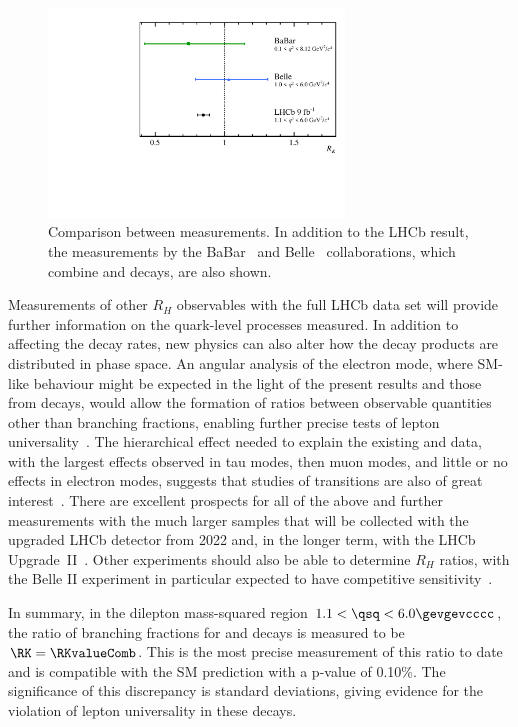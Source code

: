 \begin{figure}[!t]
    \centering
    \includegraphics[width=0.7\textwidth]{figures/Fig4.pdf} 
    \caption{Comparison between \RK measurements. 
    In addition to the LHCb result, the measurements by the BaBar~\cite{RKbabar} and Belle~\cite{RKbelle} collaborations, which combine \BuKll and \BdKSll decays, are also shown.
    }
    \label{fig:RKresult}
\end{figure}

Measurements of other $R_H$ observables with the full LHCb data set will provide further information on the quark-level processes measured. 
In addition to affecting the decay rates, new physics can also alter how the decay products are distributed in phase space. 
An angular analysis of the electron mode, where SM-like behaviour might be expected in the light of the present results and those from \btosmumubar decays, would allow the formation of ratios between observable quantities other than branching fractions, enabling further precise tests of lepton universality~\cite{Altmannshofer:2015mqa,Capdevila:2016ivx,Wehle:2016yoi,Geng:2017svp,Serra:2016ivr}. The hierarchical effect needed to explain the existing \bsllbar and \btoclnubar data, with the largest effects observed in tau modes, then muon modes, and little or no effects in electron modes, suggests that studies of \btostautaubar transitions are also of great interest~\cite{LHCb-PAPER-2017-003, TheBaBar:2016xwe}. There are excellent prospects for all of the above and further measurements with the much larger samples that will be collected with the upgraded LHCb detector from 2022 and, in the longer term, with the LHCb Upgrade~II~\cite{LHCb-PII-Physics}. Other experiments should also be able to determine $R_H$ ratios, with the Belle II experiment in particular expected to have competitive sensitivity~\cite{Kou:2018nap}.

In summary, in the dilepton mass-squared region $1.1 < \qsq < 6.0 \gevgevcccc$, the ratio of branching fractions for \BuKmm and \BuKee decays is measured to be $\RK=\RKvalueComb$. 
This is the most precise measurement of this ratio to date and is compatible with the SM prediction with a p-value of 0.10\%. The significance of this discrepancy is \significance standard deviations, giving evidence for the violation of lepton universality in these decays.